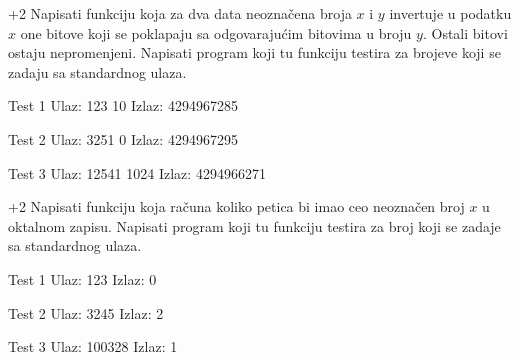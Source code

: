 
\begin{Exercise}[label=211]\marker+{2}
  Napisati funkciju koja za dva data neoznačena broja $x$
  i $y$ invertuje u podatku $x$ one bitove koji se poklapaju
  sa odgovarajućim bitovima u broju $y$. Ostali bitovi ostaju
  nepromenjeni.  Napisati program koji tu funkciju testira za brojeve
  koji se zadaju sa standardnog ulaza.
  
\begin{minitest}
\begin{test}{Test 1}
Ulaz:   123 10        
Izlaz:  4294967285    
\end{test}
\end{minitest}
\begin{minitest}
\begin{test}{Test 2}
Ulaz:  3251 0    
Izlaz: 4294967295    
\end{test}
\end{minitest}
\begin{minitest}
\begin{test}{Test 3}
Ulaz:   12541 1024
Izlaz:  4294966271
\end{test}
\end{minitest}
\end{Exercise}
\begin{Answer}[ref=211]
\end{Answer}

\begin{Exercise}[label=212]\marker+{2}
Napisati funkciju koja računa koliko petica bi imao ceo
  neoznačen broj $x$ u oktalnom zapisu. Napisati program koji
  tu funkciju testira za broj koji se zadaje sa standardnog ulaza.
  
\begin{minitest}
\begin{test}{Test 1}
Ulaz:   123        
Izlaz:  0             
\end{test}
\end{minitest}
\begin{minitest}
\begin{test}{Test 2}
Ulaz:   3245      
Izlaz:  2              
\end{test}
\end{minitest}
\begin{minitest}
\begin{test}{Test 3}
Ulaz:   100328
Izlaz:  1
\end{test}
\end{minitest}  
\end{Exercise}
\begin{Answer}[ref=212]
\end{Answer}
